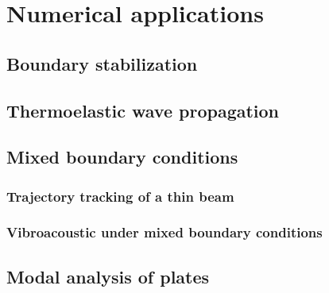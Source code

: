 \chapter{Numerical applications}

\section{Boundary stabilization}

\section{Thermoelastic wave propagation}

\section{Mixed boundary conditions}

\subsection{Trajectory tracking of a thin beam}

\subsection{Vibroacoustic under mixed boundary conditions}

\section{Modal analysis of plates}